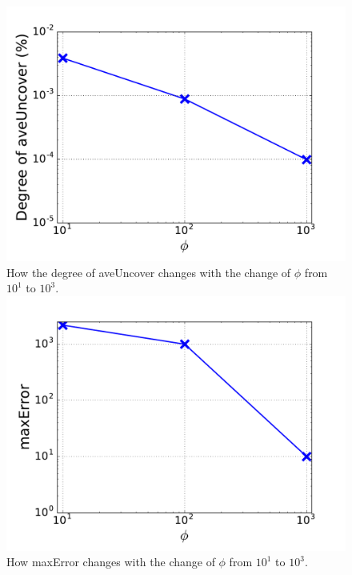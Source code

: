 \begin{figure}[!htb]
  \includegraphics[width=\linewidth]{figure/aveUncover.pdf}
  {How the degree of aveUncover changes with the change of $\phi$ from $10^1$ to $10^3$.}
\endminipage\hfill
{}%
  \includegraphics[width=\linewidth]{figure/maxError.pdf}
  {How maxError changes with the change of $\phi$ from $10^1$ to $10^3$.}

\endminipage
\vspace{-0.1in}
\end{figure}